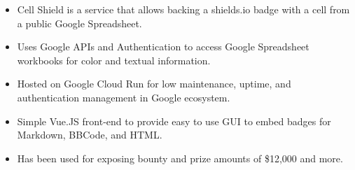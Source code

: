 \documentclass[10pt,letter,ragged2e]{altacv}
\begin{document}
\begin{paracol}{2}



\begin{itemize}
\item Cell Shield is a service that allows backing a shields.io badge with a cell from a public Google Spreadsheet.
\item Uses Google APIs and Authentication to access Google Spreadsheet workbooks for color and textual information.
\item Hosted on Google Cloud Run for low maintenance, uptime, and authentication management in Google ecosystem.
\item Simple Vue.JS front-end to provide easy to use GUI to embed badges for Markdown, BBCode, and HTML.
\item Has been used for exposing bounty and prize amounts of \$12,000 and more.
\end{itemize}



\end{paracol}
\end{document}
